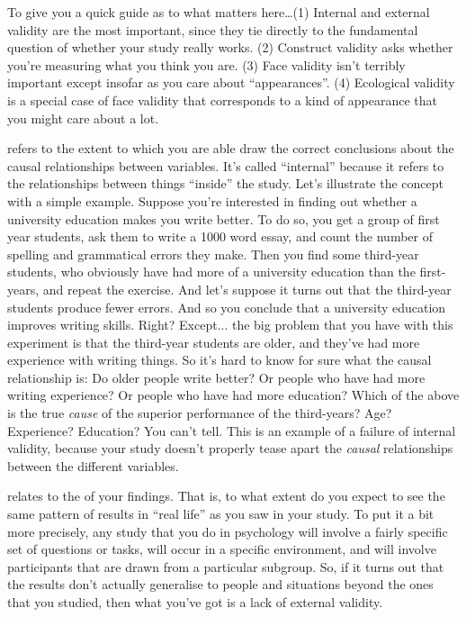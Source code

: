 \noindent
To give you a quick guide as to what matters here\ldots (1) Internal and external validity are the most important, since they tie directly to the fundamental question of whether your study really works. (2) Construct validity asks whether you're measuring what you think you are. (3) Face validity isn't terribly important except insofar as you care about ``appearances''. (4) Ecological validity is a special case of face validity that corresponds to a kind of appearance that you might care about a lot.


 refers to the extent to which you are able draw the correct conclusions about the causal relationships between variables. It's called ``internal'' because it refers to the relationships between things ``inside'' the study.  Let's illustrate the concept with a simple example. Suppose you're interested in finding out whether a university education makes you write better. To do so, you get a group of first year students, ask them to write a 1000 word essay, and count the number of spelling and grammatical errors they make. Then you find some third-year students, who obviously have had more of a university education than the first-years, and repeat the exercise. And let's suppose it turns out that the third-year students produce fewer errors. And so you conclude that a university education improves writing skills. Right? Except... the big problem that you have with this experiment is that the third-year students are older, and they've had more experience with writing things. So it's hard to know for sure what the causal relationship is: Do older people write better? Or people who have had more writing experience? Or people who have had more education? Which of the above is the true {\it cause} of the superior performance of the third-years? Age? Experience? Education?  You can't tell.  This is an example of a failure of internal validity, because your study doesn't properly tease apart the {\it causal} relationships between the different variables. 




 relates to the  of your findings. That is, to what extent do you expect to see the same pattern of results in ``real life'' as you saw in your study. To put it a bit more precisely, any study that you do in psychology will involve a fairly specific set of questions or tasks, will occur in a specific environment, and will involve participants that are drawn from a particular subgroup. So, if it turns out that the results don't actually generalise to people and situations beyond the ones that you studied, then what you've got is a lack of external validity.

